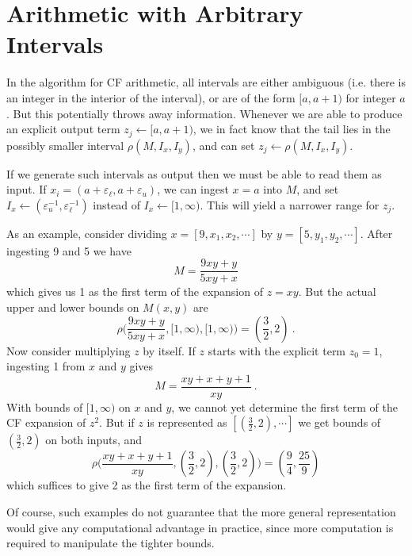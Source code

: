 \documentclass[11pt, oneside]{amsart}   	%
\begin{document}
\section{Arithmetic with Arbitrary Intervals}
In the algorithm for CF arithmetic, all intervals are either ambiguous (i.e. there is an integer in the interior of the interval), or are of the form $[a,a+1)$ for integer $a$. But this potentially throws away information.
Whenever we are able to produce an explicit output term $z_j \leftarrow [a,a+1)$, we in fact know that the tail lies in the possibly smaller interval $\rho(M,I_x, I_y)$, and can set $z_j \leftarrow \rho(M,I_x, I_y)$.

If we generate such intervals as output then we must be able to read them as input. If $x_i = (a+\varepsilon_\ell, a+\varepsilon_u)$, we can ingest $x=a$ into $M$, and set $I_x \leftarrow (\varepsilon_u^{-1}, \varepsilon_\ell^{-1})$ instead of $I_x \leftarrow [1,\infty)$. This will yield a narrower range for $z_j$.

As an example, consider dividing $x=[9,x_1, x_2,\cdots]$ by $y=[5,y_1, y_2,\cdots]$. After ingesting 9 and 5 we have
\[
M = \frac{9xy + y}{5xy + x}
\]
which gives us 1 as the first term of the expansion of $z=xy$. But the actual upper and lower bounds on $M(x,y)$ are
\[
\rho\bigl(\frac{9xy + y}{5xy + x}, [1,\infty), [1,\infty)\bigr) = (\frac{3}{2}, 2)\ .
\]
Now consider multiplying $z$ by itself. If $z$ starts with the explicit term $z_0=1$, ingesting 1 from $x$ and $y$ gives
\[
M  = \frac{xy+x+y+1}{xy}\ .
\]
With bounds of $[1,\infty)$ on $x$ and $y$, we cannot yet determine the first term of the CF expansion of $z^2$. But if $z$ is represented as $[(\frac{3}{2},2), \cdots]$ we get bounds of $(\frac{3}{2}, 2)$ on both inputs, and
\[
\rho\bigl(\frac{xy+x+y+1}{xy}, (\frac{3}{2}, 2), (\frac{3}{2}, 2)\bigr) = (\frac{9}{4}, \frac{25}{9})
\]
which suffices to give 2 as the first term of the expansion.

Of course, such examples do not guarantee that the more general representation would give any computational advantage in practice, since more computation is required to manipulate the tighter bounds.



\end{document}
